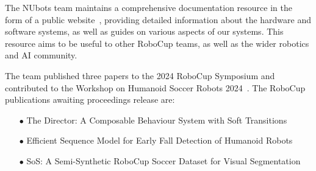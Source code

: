 \documentclass{llncs}
\begin{document}
The NUbots team maintains a comprehensive documentation resource in the form of a public website~\cite{nubotsNUbookGit}, providing detailed information about the hardware and software systems, as well as guides on various aspects of our systems. This resource aims to be useful to other RoboCup teams, as well as the wider robotics and AI community.

The team published three papers to the 2024 RoboCup Symposium and contributed to the Workshop on Humanoid Soccer Robots 2024~\cite{OBrien2024}. The RoboCup publications awaiting proceedings release are:

\begin{itemize}
    \item[$\bullet$] The Director: A Composable Behaviour System with Soft Transitions
    \item[$\bullet$] Efficient Sequence Model for Early Fall Detection of Humanoid Robots
    \item[$\bullet$] SoS: A Semi-Synthetic RoboCup Soccer Dataset for Visual Segmentation
\end{itemize}




\end{document}
